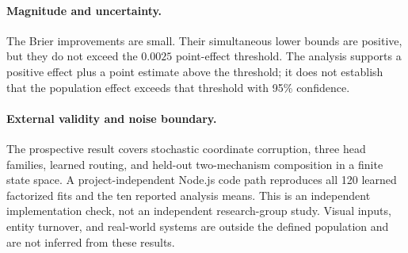 \paragraph{Magnitude and uncertainty.}
The Brier improvements are small.  Their simultaneous lower bounds are
positive, but they do not exceed the \(0.0025\) point-effect threshold.  The
analysis supports a positive effect plus a point estimate above the threshold;
it does not establish that the population effect exceeds that threshold with
95\% confidence.

\paragraph{External validity and noise boundary.}
The prospective result covers stochastic coordinate corruption, three head
families, learned routing, and held-out two-mechanism composition in a finite
state space.  A project-independent Node.js code path reproduces all 120
learned factorized fits and the ten reported analysis means.  This is an
independent implementation check, not an independent research-group study.
Visual inputs, entity turnover, and real-world systems are outside the defined
population and are not inferred from these results.
